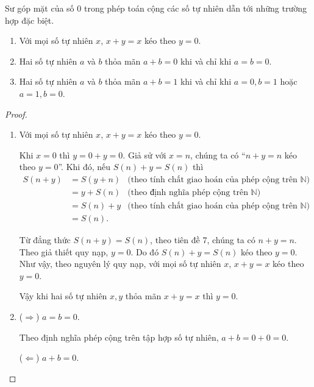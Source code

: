 Sư góp mặt của số $0$ trong phép toán cộng các số tự nhiên dẫn tới những trường hợp  đặc biệt.
\begin{theorem}\label{theorem:addition-and-zero}
    \begin{enumerate}[label={(\roman*)}]
        \item Với mọi số tự nhiên $x$, $x + y = x$ kéo theo $y = 0$.
        \item Hai số tự nhiên $a$ và $b$ thỏa mãn $a + b = 0$ khi và chỉ khi $a = b = 0$.
        \item Hai số tự nhiên $a$ và $b$ thỏa mãn $a + b = 1$ khi và chỉ khi $a = 0, b = 1$ hoặc $a = 1, b = 0$.
    \end{enumerate}
\end{theorem}

\begin{proof}
    \begin{enumerate}[label={(\roman*)}]
        \item Với mọi số tự nhiên $x$, $x + y = x$ kéo theo $y = 0$.

              Khi $x = 0$ thì $y = 0 + y = 0$. Giả sử với $x = n$, chúng ta có ``$n + y = n$ kéo theo $y = 0$''. Khi đó, nếu $S(n) + y = S(n)$ thì
              \begin{align*}
                  S(n + y) & = S(y + n) & \text{(theo tính chất giao hoán của phép cộng trên $\mathbb{N}$)} \\
                           & = y + S(n) & \text{(theo định nghĩa phép cộng trên $\mathbb{N}$)}              \\
                           & = S(n) + y & \text{(theo tính chất giao hoán của phép cộng trên $\mathbb{N}$)} \\
                           & = S(n).
              \end{align*}

              Từ đẳng thức $S(n + y) = S(n)$, theo tiên đề 7, chúng ta có $n + y = n$. Theo giả thiết quy nạp, $y = 0$. Do đó $S(n) + y = S(n)$ kéo theo $y = 0$. Như vậy, theo nguyên lý quy nạp, với mọi số tự nhiên $x$, $x + y = x$ kéo theo $y = 0$.

              Vậy khi hai số tự nhiên $x, y$ thỏa mãn $x + y = x$ thì $y = 0$.
        \item ($\Rightarrow$) $a = b = 0$.

              Theo định nghĩa phép cộng trên tập hợp số tự nhiên, $a + b = 0 + 0 = 0$.

              ($\Leftarrow$) $a + b = 0$.


\end{enumerate}
\end{proof}
